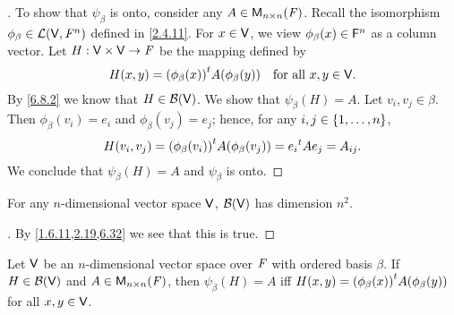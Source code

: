 \begin{proof}[]
  To show that \(\psi_{\beta}\) is onto, consider any \(A \in \ms[n][n][\F]\).
  Recall the isomorphism \(\phi_{\beta} \in \mathcal{L}(\mathsf{V}, \mathsf{\mathit{F}}^n)\) defined in \cref{2.4.11}.
  For \(x \in \mathsf{V}\), we view \(\phi_{\beta}(x) \in \mathsf{F}^n\) as a column vector.
  Let \(H : \mathsf{V} \times \mathsf{V} \to \mathit{F}\) be the mapping defined by
  \[
    H(x, y) = {(\phi_{\beta}(x))}^{t} A (\phi_{\beta}(y)) \quad \text{for all } x, y \in \mathsf{V}.
  \]
  By \cref{6.8.2} we know that \(H \in \mathcal{B}(\mathsf{V})\).
  We show that \(\psi_{\beta}(H) = A\).
  Let \(v_i, v_j \in \beta\).
  Then \(\phi_{\beta}(v_i) = e_i\) and \(\phi_{\beta}(v_j) = e_j\);
  hence, for any \(i, j \in \left\lbrace1, \dots, n\right\rbrace\),
  \[
    H(v_i, v_j) = {(\phi_{\beta}(v_i))}^{t} A (\phi_{\beta}(v_j)) = {e_i}^{t} A e_j = A_{i j}.
  \]
  We conclude that \(\psi_{\beta}(H) = A\) and \(\psi_{\beta}\) is onto.
\end{proof}

\begin{cor}\label{6.8.6}
  For any \(n\)-dimensional vector space \(\mathsf{V}\), \(\mathcal{B}(\mathsf{V})\) has dimension \(n^2\).
\end{cor}

\begin{proof}[]
  By \cref{1.6.11,2.19,6.32} we see that this is true.
\end{proof}

\begin{cor}\label{6.8.7}
  Let \(\mathsf{V}\) be an \(n\)-dimensional vector space over \(\mathit{F}\) with ordered basis \(\beta\).
  If \(H \in \mathcal{B}(\mathsf{V})\) and \(A \in \ms[n][n][\F]\), then \(\psi_{\beta}(H) = A\) iff \(H(x, y) = {(\phi_{\beta}(x))}^{t} A (\phi_{\beta}(y))\) for all \(x, y \in \mathsf{V}\).
\end{cor}

